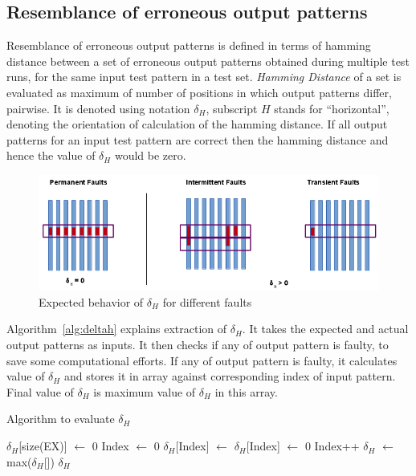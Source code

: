 \subsection{Resemblance of erroneous output patterns}
Resemblance of erroneous output patterns is defined in terms of hamming distance between a set of erroneous output patterns obtained during multiple test runs, for the same input test pattern in a test set. \emph{Hamming Distance} of a set is evaluated as maximum of number of positions in which output patterns differ, pairwise. It is denoted using notation $\delta_H$, subscript $H$ stands for \enquote{horizontal}, denoting the orientation of calculation of the hamming distance. If all output patterns for an input test pattern are correct then the hamming distance and hence the value of $\delta_H$ would be zero.

\begin{figure}[h]
  \begin{center}
    \captionsetup{justification=centering}
    \includegraphics[scale=1.00]{figures/deltah.png}
    \caption{Expected behavior of $\delta_H$ for different faults}
    \label{fig:deltah}
  \end{center}
\end{figure}

Algorithm~\ref{alg:deltah} explains extraction of $\delta_H$. It takes the expected and actual output patterns as inputs. It then checks if any of output pattern is faulty, to save some computational efforts. If  any of output pattern is faulty, it calculates value of $\delta_H$ and stores it in array against corresponding index of input pattern. Final value of $\delta_H$ is maximum value of $\delta_H$ in this array. 

\begin{algorithm}[H]
  \caption{Algorithm to evaluate $\delta_H$}
  \label{alg:deltah}
  \begin{algorithmic}
 \State $\delta_H$[size(EX)] $\leftarrow$ 0\;
 \State Index $\leftarrow$ 0\;
   \State $\delta_H$[Index] $\leftarrow$ \;
  \Else
   \State $\delta_H$[Index] $\leftarrow$ 0\;
  \EndIf
  \State Index++\;
 \EndWhile
 \State$\delta_H$ $\leftarrow$ max($\delta_H$[])\;
 \State \Return $\delta_H$\;
 \EndProcedure
 \end{algorithmic}
\end{algorithm}


